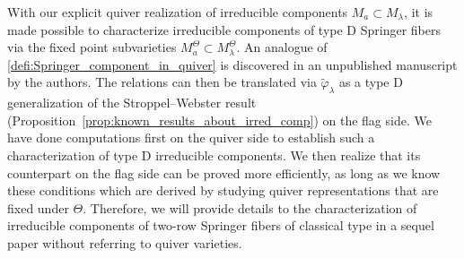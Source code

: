 \documentclass[11pt,reqno]{amsart}
\numberwithin{equation}{section}
\theoremstyle{definition}
\newcommand{\ld}{\lambda}
\newcommand{\tphi}{\widetilde{\varphi}}
\begin{document}
With our explicit quiver realization of irreducible components $M_a \subset M_\ld$, it is made possible to characterize irreducible components of type D Springer fibers via the fixed point subvarieties $M^\Theta_a \subset M^\Theta_\ld$.
An analogue of \eqref{defi:Springer_component_in_quiver}  is discovered in an unpublished manuscript \cite[\S5--7]{ILW19} by the authors.
The relations can then be translated via $\tphi_\ld$ as a type D generalization of the Stroppel--Webster result (Proposition~\ref{prop:known_results_about_irred_comp}) on the flag side.
We have done computations first on the quiver side to establish such a characterization of type D irreducible components.
We then realize that its counterpart on the flag side can be proved more efficiently, as long as we know these conditions which are derived by studying quiver representations that are fixed under $\Theta$. 
Therefore, we will provide details to the characterization of irreducible components of two-row Springer fibers of classical type in a sequel paper \cite{ILW20b} without referring to quiver varieties.

 \label{references}

 
\end{document}
